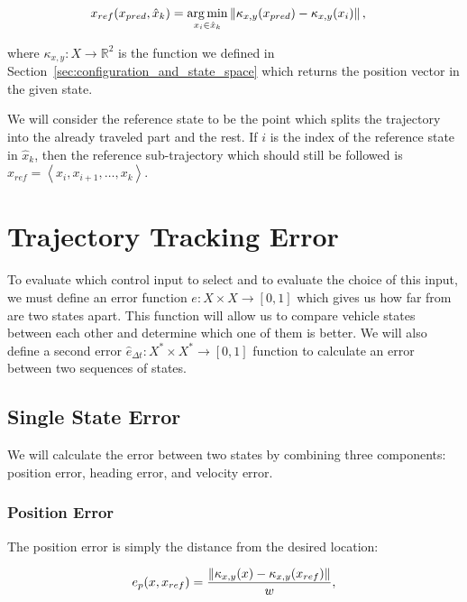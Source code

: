 \begin{equation}
\begin{aligned}
x_{ref}(x_{pred}, \hat{x}_k)&=\operatorname*{arg\,min}_{x_i \in \hat{x}_k} \left\lVert\kappa_{x,y}(x_{pred})-\kappa_{x,y}(x_i)\right\rVert,
\end{aligned}
\end{equation}
	
where $\kappa_{x,y}: X\rightarrow \mathbb{R}^2$ is the function we defined in Section~\ref{sec:configuration_and_state_space} which returns the position vector in the given state.

We will consider the reference state to be the point which splits the trajectory into the already traveled part and the rest. If $i$ is the index of the reference state in $\hat{x}_k$, then the reference sub-trajectory which should still be followed is $\hat{x}_{ref}=\left\langle x_i, x_{i+1}, \ldots, x_k \right\rangle$.

\section{Trajectory Tracking Error}

To evaluate which control input to select and to evaluate the choice of this input, we must define an error function $e: X\times X\rightarrow \left[0, 1\right]$ which gives us how far from are two states apart. This function will allow us to compare vehicle states between each other and determine which one of them is better. We will also define a second error $\hat{e}_{\Delta t}: X^*\times X^*\rightarrow \left[0, 1\right]$ function to calculate an error between two sequences of states.

\subsection{Single State Error}

We will calculate the error between two states by combining three components: position error, heading error, and velocity error.

\subsubsection{Position Error}

The position error is simply the distance from the desired location:

\begin{equation}
	\label{eq:position_error}
	e_p(x, x_{ref})=\dfrac{\left\lVert\kappa_{x,y}(x)-\kappa_{x,y}(x_{ref})\right\rVert}{w},
\end{equation}

